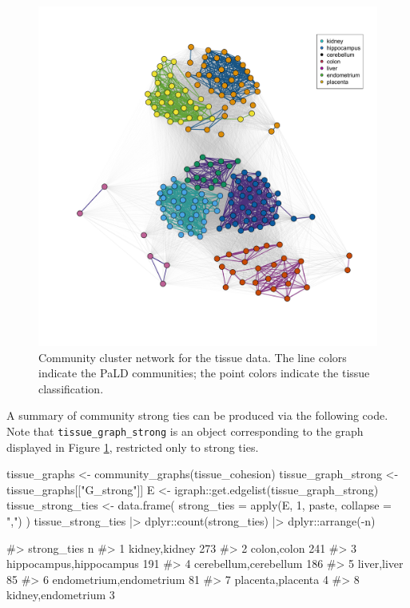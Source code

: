 \begin{Schunk}
\begin{figure}[H]
\includegraphics[width=5.5in,trim=0in 5in 0in 3in,clip]{fig5} \caption[Community cluster network for the tissue data]{Community cluster network for the tissue data. The line colors indicate the PaLD communities; the point colors indicate the tissue classification.}\label{fig:fig4}
\end{figure}
\end{Schunk}

A summary of community strong ties can be produced via the following
code. Note that \texttt{tissue\_graph\_strong} is an 
object corresponding to the graph displayed in Figure \ref{fig:fig4},
restricted only to strong ties.

\begin{Schunk}
\begin{Sinput}
tissue_graphs <- community_graphs(tissue_cohesion)
tissue_graph_strong <- tissue_graphs[["G_strong"]]
E <- igraph::get.edgelist(tissue_graph_strong)
tissue_strong_ties <- data.frame(
  strong_ties = apply(E, 1, paste, collapse = ",")
)
tissue_strong_ties |>
  dplyr::count(strong_ties) |>
  dplyr::arrange(-n)
\end{Sinput}
\begin{Soutput}
#>               strong_ties   n
#> 1           kidney,kidney 273
#> 2             colon,colon 241
#> 3 hippocampus,hippocampus 191
#> 4   cerebellum,cerebellum 186
#> 5             liver,liver  85
#> 6 endometrium,endometrium  81
#> 7       placenta,placenta   4
#> 8      kidney,endometrium   3
\end{Soutput}
\end{Schunk}

